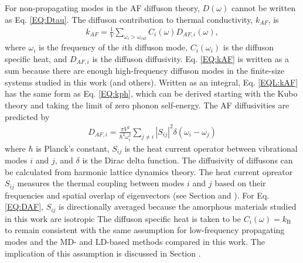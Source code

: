\documentclass[aps,prb,twocolumn,superscriptaddress,footinbib,amsmath,amssymb,floatfix]{revtex4}
\begin{document}
For non-propagating modes in the AF diffuson theory, 
$D(\omega)$ cannot be written as Eq. \eqref{EQ:Dtau}.\cite{allen_thermal_1993}  
The diffuson contribution to thermal conductivity, $k_{AF}$, is
\cite{feldman_thermal_1993,feldman_numerical_1999}
\begin{equation}\label{EQ:kAF}
\begin{split}
k_{AF} = \frac{1}{V}\sum_{\omega_i>\omega_{cut}} C_i(\omega) D_{AF,i}(\omega), 
\end{split}
\end{equation}
where $\omega_i$ is the frequency of the $i$th diffuson mode, $C_i(\omega_i)$ 
is the diffuson specific heat, and $D_{AF,i}$ is the diffuson diffusivity.
Eq. \eqref{EQ:kAF} is written as a sum because there are enough high-frequency 
diffuson modes in the finite-size systems studied in this work (and others).
\cite{feldman_thermal_1993,feldman_numerical_1999} 
Written as an integral, Eq. \eqref{EQL:kAF} has the same form as 
Eq. \ref{EQ:kph}, which can be derived starting 
with the Kubo theory
\cite{flicker_lattice_1973,allen_thermal_1993,alam_lattice_2005,
baldi_thermal_2008,yang_anomalously_2010}  
and taking the limit 
of zero phonon self-energy.\cite{baldi_thermal_2008} 
The AF diffusivities are predicted by\cite{allen_thermal_1993} 
\begin{equation}\label{EQ:DAF}
\begin{split}
D_{AF,i} = \frac{\pi V^2}{\hbar^2\omega^2_i}\sum_{j\neq i}
|S_{ij}|^2 \delta(\omega_i - \omega_j)
\end{split}
\end{equation}
where $\hbar$ is Planck's constant, $S_{ij}$ is the heat current operator 
between vibrational modes $i$ and $j$, and $\delta$ is the Dirac delta 
function. The diffusivity of diffusons 
can be calculated from harmonic lattice dynamics theory.
\cite{allen_thermal_1993,feldman_thermal_1993,feldman_numerical_1999} 
The heat current opreator $S_{ij}$ measures the thermal 
coupling between modes $i$ and $j$ based on their frequencies and 
spatial overlap of eigenvectors (see Section and ). 
For Eq. \eqref{EQ:DAF}, $S_{ij}$ is directionally averaged because 
the amorphous materials studied in this work are isotropic
The diffuson specific heat is taken to be $C_i(\omega) = k_{\text{B}}$ 
to remain consistent with the same assumption for low-frequency propagating 
modes and the MD- and LD-based methods compared in this work. The implication 
of this assumption is discussed in Section .

\end{document}
